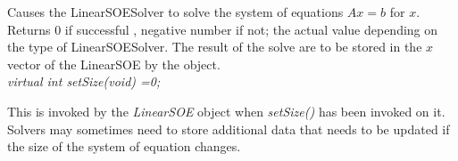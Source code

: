 Causes the LinearSOESolver to solve the system of equations $Ax=b$ for $x$.
Returns $0$ if successful , negative number if not; the actual value depending on
the type of LinearSOESolver. The result of the solve are to be stored
in the $x$ vector of the LinearSOE by the object.\\

{\em virtual int setSize(void) =0;} 

This is invoked by the {\em LinearSOE} object when {\em setSize()} has
been invoked on it. Solvers may sometimes need to store additional
data that needs to be updated if the size of the system of equation
changes. \\




